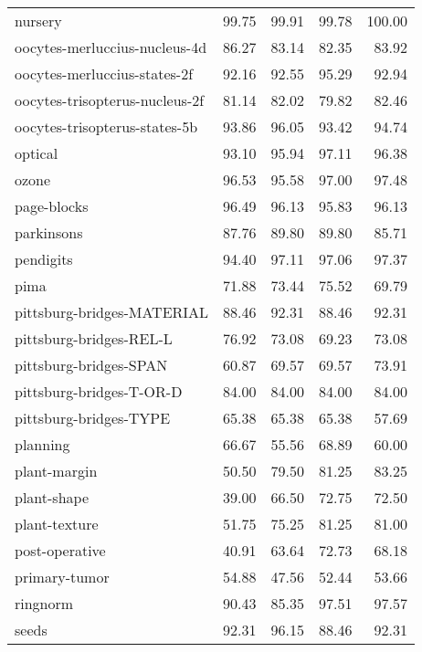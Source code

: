\begin{longtable}{lrrrr}
                       nursery &   99.75 &    99.91 &  99.78 & 100.00 \\
 oocytes-merluccius-nucleus-4d &   86.27 &    83.14 &  82.35 &  83.92 \\
  oocytes-merluccius-states-2f &   92.16 &    92.55 &  95.29 &  92.94 \\
oocytes-trisopterus-nucleus-2f &   81.14 &    82.02 &  79.82 &  82.46 \\
 oocytes-trisopterus-states-5b &   93.86 &    96.05 &  93.42 &  94.74 \\
                       optical &   93.10 &    95.94 &  97.11 &  96.38 \\
                         ozone &   96.53 &    95.58 &  97.00 &  97.48 \\
                   page-blocks &   96.49 &    96.13 &  95.83 &  96.13 \\
                    parkinsons &   87.76 &    89.80 &  89.80 &  85.71 \\
                     pendigits &   94.40 &    97.11 &  97.06 &  97.37 \\
                          pima &   71.88 &    73.44 &  75.52 &  69.79 \\
    pittsburg-bridges-MATERIAL &   88.46 &    92.31 &  88.46 &  92.31 \\
       pittsburg-bridges-REL-L &   76.92 &    73.08 &  69.23 &  73.08 \\
        pittsburg-bridges-SPAN &   60.87 &    69.57 &  69.57 &  73.91 \\
      pittsburg-bridges-T-OR-D &   84.00 &    84.00 &  84.00 &  84.00 \\
        pittsburg-bridges-TYPE &   65.38 &    65.38 &  65.38 &  57.69 \\
                      planning &   66.67 &    55.56 &  68.89 &  60.00 \\
                  plant-margin &   50.50 &    79.50 &  81.25 &  83.25 \\
                   plant-shape &   39.00 &    66.50 &  72.75 &  72.50 \\
                 plant-texture &   51.75 &    75.25 &  81.25 &  81.00 \\
                post-operative &   40.91 &    63.64 &  72.73 &  68.18 \\
                 primary-tumor &   54.88 &    47.56 &  52.44 &  53.66 \\
                      ringnorm &   90.43 &    85.35 &  97.51 &  97.57 \\
                         seeds &   92.31 &    96.15 &  88.46 &  92.31 \\

\end{longtable}
